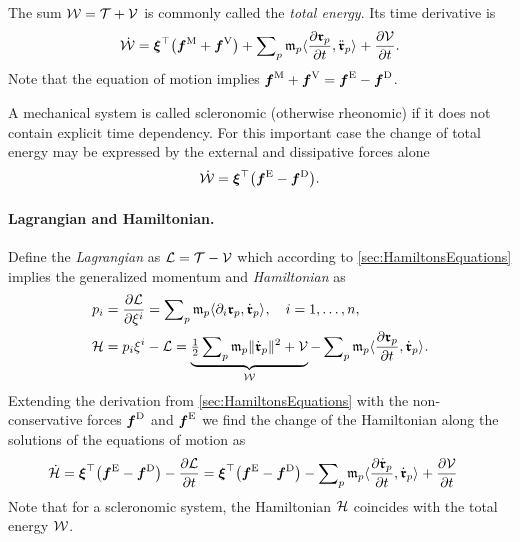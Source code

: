 The sum $\totalEnergy = \kineticEnergy + \potentialEnergy$ is commonly called the \textit{total energy}.
Its time derivative is
\begin{align}
 \dot{\totalEnergy} = \sysVel^\top \big( \genForceInertia + \genForcePotential \big) + \sumParticles \particleMass{\PidxI} \sProd{\pdiff[\particlePos{\PidxI}]{t}}{\particlePosdd{\PidxI}} + \pdiff[\potentialEnergy]{t}
 .
\end{align}
Note that the equation of motion implies $\genForceInertia + \genForcePotential = \genForceEx - \genForceDiss$.

A mechanical system is called scleronomic (otherwise rheonomic) if it does not contain explicit time dependency. 
For this important case the change of total energy may be expressed by the external and dissipative forces alone
\begin{align}
 \dot{\totalEnergy} = \sysVel^\top \big( \genForceEx - \genForceDiss \big) %
 .
\end{align}

\paragraph{Lagrangian and Hamiltonian.}
Define the \textit{Lagrangian} as $\Lagrangian = \kineticEnergy - \potentialEnergy$ which according to \autoref{sec:HamiltonsEquations} implies the generalized momentum and \textit{Hamiltonian} as
\begin{align}
 \genMomentumCoeff{\LidxI} &= \pdiff[\Lagrangian]{\sysVelCoeff{\LidxI}} = \sumParticles \particleMass{\PidxI} \sProd{\dirDiff{\LidxI} \particlePos{\PidxI}}{\particlePosd{\PidxI}}, \quad \LidxI = 1,\ldots,\dimConfigSpace,
\\
 \Hamiltonian &= \genMomentumCoeff{\LidxI} \sysVelCoeff{\LidxI} - \Lagrangian = \underbrace{\tfrac{1}{2} \sumParticles \particleMass{\PidxI} \norm{\particlePosd{\PidxI}}^2 + \potentialEnergy}_{\totalEnergy} - \sumParticles \particleMass{\PidxI} \sProd{\pdiff[\particlePos{\PidxI}]{t}}{\particlePosd{\PidxI}} 
 .
\end{align}
Extending the derivation from \autoref{sec:HamiltonsEquations} with the non-conservative forces $\genForceDiss$ and $\genForceEx$ we find the change of the Hamiltonian along the solutions of the equations of motion as
\begin{align}
 \dot{\Hamiltonian} &=  \sysVel^\top \big( \genForceEx - \genForceDiss \big) - \pdiff[\Lagrangian]{t}
 = \sysVel^\top \big( \genForceEx - \genForceDiss \big) - \sumParticles \particleMass{\PidxI} \sProd{\pdiff[\particlePosd{\PidxI}]{t}}{\particlePosd{\PidxI}} + \pdiff[\potentialEnergy]{t}
\end{align}
Note that for a scleronomic system, the Hamiltonian $\Hamiltonian$ coincides with the total energy $\totalEnergy$. 

